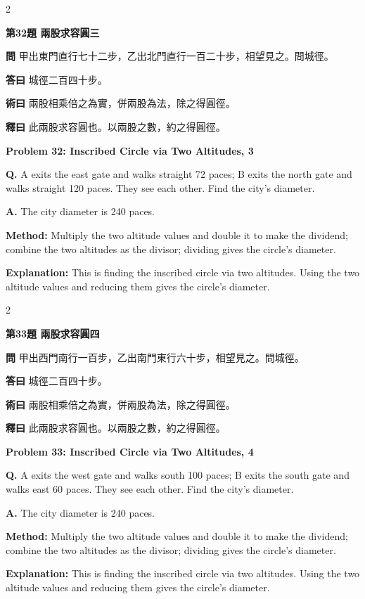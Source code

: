 \documentclass[11pt,a4paper]{article}
\newcommand{\wen}[1]{\noindent\textbf{問} #1\par\smallskip}
\newcommand{\da}[1]{\noindent\textbf{答曰} #1\par\smallskip}
\newcommand{\shu}[1]{\noindent\textbf{術曰} #1\par\smallskip}
\newcommand{\shi}[1]{\noindent\textbf{釋曰} #1\par\smallskip}
\newcommand{\wenE}[1]{\noindent\textbf{Q.} #1\par\smallskip}
\newcommand{\daE}[1]{\noindent\textbf{A.} #1\par\smallskip}
\newcommand{\shuE}[1]{\noindent\textbf{Method:} #1\par\smallskip}
\newcommand{\shiE}[1]{\noindent\textbf{Explanation:} #1\par\smallskip}
\begin{document}
\bigskip

\begin{paracol}{2}

\noindent\textbf{第32題 兩股求容圓三}

\wen{甲出東門直行七十二步，乙出北門直行一百二十步，相望見之。問城徑。}
\da{城徑二百四十步。}
\shu{兩股相乘倍之為實，併兩股為法，除之得圓徑。}
\shi{此兩股求容圓也。以兩股之數，約之得圓徑。}

\switchcolumn

\noindent\textbf{Problem 32: Inscribed Circle via Two Altitudes, 3}

\wenE{A exits the east gate and walks straight 72 paces; B exits the north gate and walks straight 120 paces. They see each other. Find the city's diameter.}
\daE{The city diameter is 240 paces.}
\shuE{Multiply the two altitude values and double it to make the dividend; combine the two altitudes as the divisor; dividing gives the circle's diameter.}
\shiE{This is finding the inscribed circle via two altitudes. Using the two altitude values and reducing them gives the circle's diameter.}

\end{paracol}

\bigskip

\begin{paracol}{2}

\noindent\textbf{第33題 兩股求容圓四}

\wen{甲出西門南行一百步，乙出南門東行六十步，相望見之。問城徑。}
\da{城徑二百四十步。}
\shu{兩股相乘倍之為實，併兩股為法，除之得圓徑。}
\shi{此兩股求容圓也。以兩股之數，約之得圓徑。}

\switchcolumn

\noindent\textbf{Problem 33: Inscribed Circle via Two Altitudes, 4}

\wenE{A exits the west gate and walks south 100 paces; B exits the south gate and walks east 60 paces. They see each other. Find the city's diameter.}
\daE{The city diameter is 240 paces.}
\shuE{Multiply the two altitude values and double it to make the dividend; combine the two altitudes as the divisor; dividing gives the circle's diameter.}
\shiE{This is finding the inscribed circle via two altitudes. Using the two altitude values and reducing them gives the circle's diameter.}

\end{paracol}

\bigskip
\end{document}
